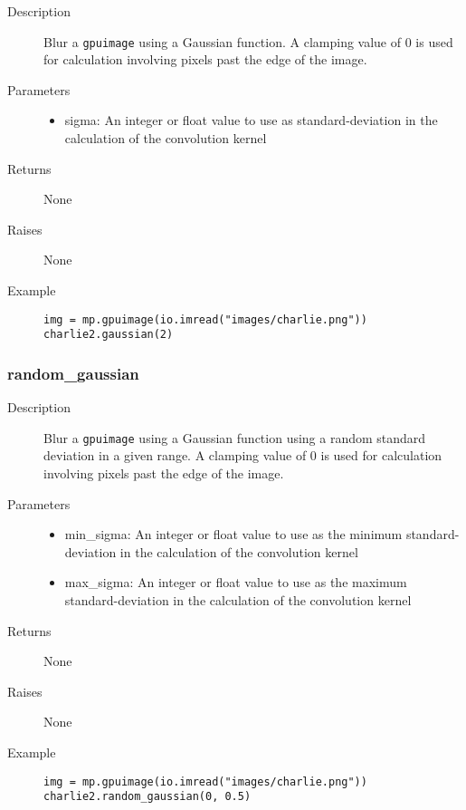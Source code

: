 \begin{description}
   \item[Description] Blur a \verb|gpuimage| using a Gaussian function. A clamping value of 0 is used for calculation involving pixels past the edge of the image.
   \item[Parameters] \phantom{}
   \begin{itemize}
   \item sigma: An integer or float value to use as standard-deviation in the calculation of the convolution kernel
   \end{itemize}
   \item[Returns] None
   \item[Raises] None
   \item[Example] \phantom{}
   \begin{lstlisting}
img = mp.gpuimage(io.imread("images/charlie.png"))
charlie2.gaussian(2)
\end{lstlisting}
\end{description}

\subsubsection{random\_gaussian}

\begin{description}
   \item[Description] Blur a \verb|gpuimage| using a Gaussian function using a random standard deviation in a given range. A clamping value of 0 is used for calculation involving pixels past the edge of the image.
   \item[Parameters] \phantom{}
   \begin{itemize}
   \item min\_sigma: An integer or float value to use as the minimum standard-deviation in the calculation of the convolution kernel
   \item max\_sigma: An integer or float value to use as the maximum standard-deviation in the calculation of the convolution kernel
   \end{itemize}
   \item[Returns] None
   \item[Raises] None
   \item[Example] \phantom{}
   \begin{lstlisting}
img = mp.gpuimage(io.imread("images/charlie.png"))
charlie2.random_gaussian(0, 0.5)
\end{lstlisting}
\end{description}

